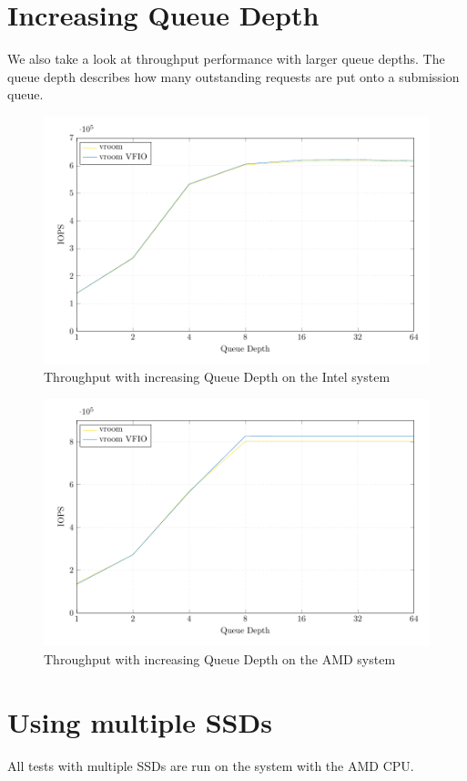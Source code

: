 \section{Increasing Queue Depth}
We also take a look at throughput performance with larger queue depths. The queue depth describes how many outstanding requests are put onto a submission queue.

\begin{figure}[H]
  \centering
  \includegraphics[width=.8\textwidth]{figures/qdnt1_2MiB}
  \caption{Throughput with increasing Queue Depth on the Intel system}
  \label{fig:qdnt1}
\end{figure}

\begin{figure}[H]
  \centering
  \includegraphics[width=.8\textwidth]{figures/qdnt1_2MiB_epyc}
  \caption{Throughput with increasing Queue Depth on the AMD system}
  \label{fig:qdnt1epyc}
\end{figure}

\section{Using multiple SSDs}
All tests with multiple SSDs are run on the system with the AMD CPU.

